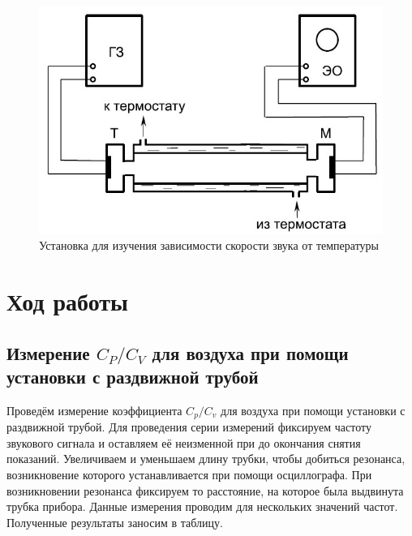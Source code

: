 \documentclass[a4paper,12pt]{article}
\theoremstyle{definition}
\begin{document}
	\begin{figure}[H]
		\begin{center}
			\includegraphics[width=12cm]{ust2.jpg}
		\end{center}
		\caption{Установка для изучения зависимости скорости звука от температуры}
		\label{img2}
	\end{figure}
	
	\section{Ход работы}
	
	\subsection{Измерение $ C_P/C_V $ для воздуха при помощи установки с раздвижной трубой}
	
	\label{ident}
	
	Проведём измерение коэффициента $ C_p/C_v $ для воздуха при помощи установки с раздвижной трубой. Для проведения серии измерений фиксируем частоту звукового сигнала и оставляем её неизменной при до окончания снятия показаний. Увеличиваем и уменьшаем длину трубки, чтобы добиться резонанса, возникновение которого устанавливается при помощи осциллографа. При возникновении резонанса фиксируем то расстояние, на которое была выдвинута трубка прибора. Данные измерения проводим для нескольких значений частот. Полученные результаты заносим в таблицу.
	
\end{document}

